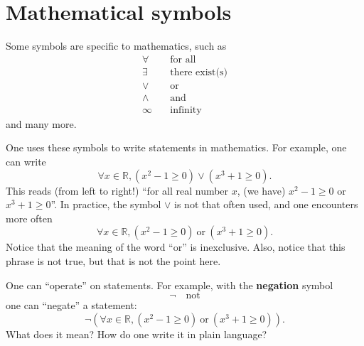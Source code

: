 \documentclass[
	fontsize=10pt, %
	twoside=true, %
	secnumdepth=1, %
	numbers=noenddot, %
]{kaobook}
\begin{document}
\section{Mathematical symbols}
Some symbols are specific to mathematics, such as
\begin{equation*}
\begin{split}
\forall&\quad \text{for all}\\
\exists&\quad \text{there exist(s)}\\
\lor&\quad \text{or}\\
\land&\quad \text{and}\\
\infty&\quad \text{infinity}
\end{split}
\end{equation*}
and many more.

One uses these symbols to write statements in mathematics. For example, one can write
\begin{equation*}
\forall x\in\mathbb{R}, (x^2-1\geq 0)\lor (x^3+1\geq 0).
\end{equation*}
This reads (from left to right!) ``for all real number $x$, (we have) $x^2-1\geq 0$ or $x^3+1\geq 0$''. In practice, the symbol $\lor$ is not that often used, and one encounters more often
\begin{equation*}
\forall x\in\mathbb{R}, (x^2-1\geq 0)~\text{or}~(x^3+1\geq 0).
\end{equation*}
Notice that the meaning of the word ``or'' is inexclusive. Also, notice that this phrase is not true, but that is not the point here.

One can ``operate'' on statements. For example, with the \textbf{negation} symbol
\begin{equation*}
\neg\quad \text{not}
\end{equation*}
one can ``negate'' a statement:
\begin{equation*}
\neg \left(\forall x\in\mathbb{R}, (x^2-1\geq 0)~\text{or}~(x^3+1\geq 0)\right).
\end{equation*}
What does it mean? How do one write it in plain language?
\end{document}
